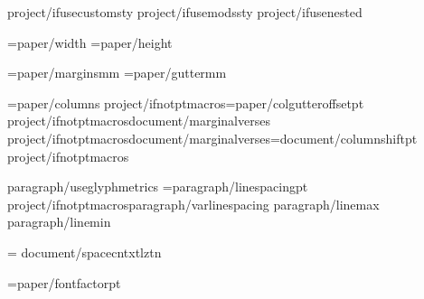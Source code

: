 


{project/ifusecustomsty}
{project/ifusemodssty} %
{project/ifusenested}    %

\PaperWidth={paper/width}
\PaperHeight={paper/height}

\MarginUnit={paper/margins}mm
\def\TopMarginFactor{{{paper/topmarginfactor}}}
\def\BottomMarginFactor{{{paper/bottommarginfactor}}}
\def\SideMarginFactor{{{paper/sidemarginfactor}}}
\BindingGutter={paper/gutter}mm

\BodyColumns={paper/columns}
\def\ColumnGutterFactor{{{document/colgutterfactor}}}
{project/ifnotptmacros}\ColumnGutterRuleSkip={paper/colgutteroffset}pt
{project/ifnotptmacros}{document/marginalverses}
{project/ifnotptmacros}{document/marginalverses}\columnshift={document/columnshift}pt
{project/ifnotptmacros}

\def\LineSpacingFactor{{{paragraph/linespacingfactor}}}
\def\VerticalSpaceFactor{{1.0}}
{paragraph/useglyphmetrics}
\baselineskip={paragraph/linespacing}pt {project/ifnotptmacros}{paragraph/varlinespacing} {paragraph/linemax} {paragraph/linemin}

\XeTeXinterwordspaceshaping = {document/spacecntxtlztn}

\FontSizeUnit={paper/fontfactor}pt
\def\regular{{"{fontregular/name}{font/features}{document/script}{document/digitmapping}"}}
\def\bold{{"{fontbold/name}{font/features}{document/script}{document/digitmapping}{fontbold/embolden}{fontbold/slant}"}}
\def\italic{{"{fontitalic/name}{font/features}{document/script}{document/digitmapping}{fontitalic/embolden}{fontitalic/slant}"}}
\def\bolditalic{{"{fontbolditalic/name}{font/features}{document/script}{document/digitmapping}{fontbolditalic/embolden}{fontbolditalic/slant}"}}


